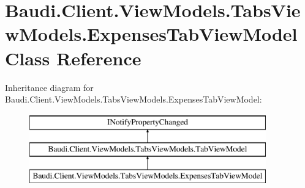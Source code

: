 \hypertarget{class_baudi_1_1_client_1_1_view_models_1_1_tabs_view_models_1_1_expenses_tab_view_model}{}\section{Baudi.\+Client.\+View\+Models.\+Tabs\+View\+Models.\+Expenses\+Tab\+View\+Model Class Reference}
\label{class_baudi_1_1_client_1_1_view_models_1_1_tabs_view_models_1_1_expenses_tab_view_model}
Inheritance diagram for Baudi.\+Client.\+View\+Models.\+Tabs\+View\+Models.\+Expenses\+Tab\+View\+Model\+:\begin{figure}[H]
\begin{center}
\leavevmode
\includegraphics[height=3.000000cm]{class_baudi_1_1_client_1_1_view_models_1_1_tabs_view_models_1_1_expenses_tab_view_model}
\end{center}
\end{figure}
